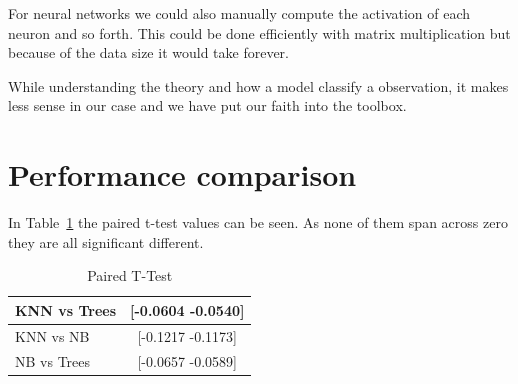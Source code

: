 For neural networks we could also manually compute the activation of each neuron and so forth. This could be done efficiently with matrix multiplication but because of the data size it would take forever. 

While understanding the theory and how a model classify a observation, it makes less sense in our case and we have put our faith into the toolbox. 

\section{Performance comparison}
In Table~\ref{tab:ttest} the paired t-test values can be seen. As none of them span across zero they are all significant different.
\begin{table}[h]
\centering
\begin{tabular}{|l|c|}
\hline
KNN vs Trees & [-0.0604   -0.0540] \\ \hline
KNN vs NB	 & [-0.1217   -0.1173]\\ \hline   %
NB vs Trees  & [-0.0657   -0.0589] \\ \hline					%
\end{tabular}\\
\caption{Paired T-Test\label{tab:ttest}}
\end{table}